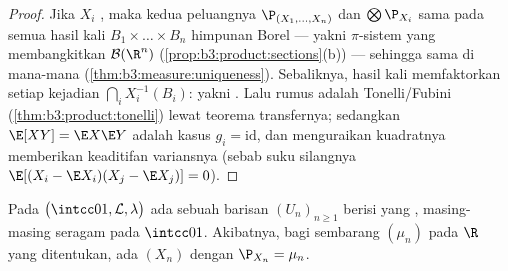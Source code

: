 \begin{proof}
Jika $X_i$ , maka kedua  peluangnya
$\P_{(X_1,\dots,X_n)}$ dan $\bigotimes\P_{X_i}$ sama pada semua
hasil kali $B_1\times\dots\times B_n$ himpunan Borel --- yakni
$\pi$-sistem yang membangkitkan $\mathcal B(\R^n)$
(\cref{prop:b3:product:sections}(b)) --- sehingga sama di mana-mana
(\cref{thm:b3:measure:uniqueness}). Sebaliknya,  hasil kali
memfaktorkan setiap kejadian $\bigcap_iX_i^{-1}(B_i)$: yakni . Lalu rumus  adalah
Tonelli/Fubini (\cref{thm:b3:product:tonelli}) lewat
teorema transfernya; sedangkan $\E[XY] = \E X\E Y$ adalah kasus $g_i =
\mathrm{id}$, dan menguraikan kuadratnya memberikan keaditifan
variansnya (sebab suku silangnya $\E[(X_i - \E X_i)(X_j - \E X_j)]
= 0$).
\end{proof}

\begin{theorem}
\label{thm:b3:probability:existence}
Pada $\bigl(\intcc01, \mathcal L, \lambda\bigr)$ ada sebuah
barisan $(U_n)_{n\geq1}$ berisi  yang ,
masing-masing seragam pada $\intcc01$. Akibatnya, bagi sembarang
 $(\mu_n)$ pada $\R$ yang ditentukan, ada $(X_n)$  dengan
$\P_{X_n} = \mu_n$.
\end{theorem}

